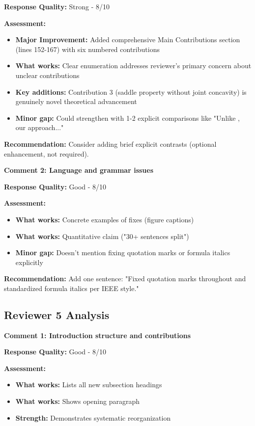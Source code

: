 \documentclass[11pt]{article}
\begin{document}
\textbf{Response Quality:} \textcolor{success}{Strong - 8/10}

\textbf{Assessment:}
\begin{itemize}[leftmargin=*]
\item \textbf{Major Improvement:} Added comprehensive Main Contributions section (lines 152-167) with six numbered contributions
\item \textbf{What works:} Clear enumeration addresses reviewer's primary concern about unclear contributions
\item \textbf{Key additions:} Contribution 3 (saddle property without joint concavity) is genuinely novel theoretical advancement
\item \textbf{Minor gap:} Could strengthen with 1-2 explicit comparisons like "Unlike \cite{bental2009}, our approach..."
\end{itemize}

\textbf{Recommendation:} Consider adding brief explicit contrasts (optional enhancement, not required).

\vspace{0.3cm}

\textbf{Comment 2: Language and grammar issues}

\textbf{Response Quality:} \textcolor{success}{Good - 8/10}

\textbf{Assessment:}
\begin{itemize}[leftmargin=*]
\item \textbf{What works:} Concrete examples of fixes (figure captions)
\item \textbf{What works:} Quantitative claim ("30+ sentences split")
\item \textbf{Minor gap:} Doesn't mention fixing quotation marks or formula italics explicitly
\end{itemize}

\textbf{Recommendation:} Add one sentence: "Fixed quotation marks throughout and standardized formula italics per IEEE style."

\subsection{Reviewer 5 Analysis}

\textbf{Comment 1: Introduction structure and contributions}

\textbf{Response Quality:} \textcolor{success}{Good - 8/10}

\textbf{Assessment:}
\begin{itemize}[leftmargin=*]
\item \textbf{What works:} Lists all new subsection headings
\item \textbf{What works:} Shows opening paragraph
\item \textbf{Strength:} Demonstrates systematic reorganization
\end{itemize}
\end{document}
